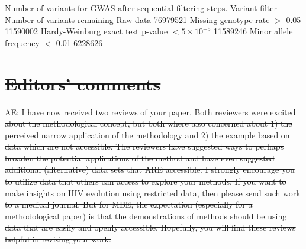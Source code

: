 \documentclass[12pt]{article} %
\providecommand{\DIFdel}[1]{{\protect\color{red}\sout{#1}}}                      %
\providecommand{\DIFdelbegin}{} %
\providecommand{\DIFdelend}{} %
\providecommand{\DIFdelFL}[1]{\DIFdel{#1}} %
\newcommand{\DIFscaledelfig}{0.5}
\newlength{\DIFdelgraphicswidth} %
\newlength{\DIFdelgraphicsheight} %
\newcommand{\DIFdelincludegraphics}[2][]{%
\sbox{\DIFdelgraphicsbox}{\DIFOincludegraphics[#1]{#2}}%
\settoboxwidth{\DIFdelgraphicswidth}{\DIFdelgraphicsbox} %
\settoboxtotalheight{\DIFdelgraphicsheight}{\DIFdelgraphicsbox} %
\scalebox{\DIFscaledelfig}{%
\parbox[b]{\DIFdelgraphicswidth}{\usebox{\DIFdelgraphicsbox}\\[-\baselineskip] \rule{\DIFdelgraphicswidth}{0em}}\llap{\resizebox{\DIFdelgraphicswidth}{\DIFdelgraphicsheight}{%
\setlength{\unitlength}{\DIFdelgraphicswidth}%
\begin{picture}(1,1)%
\thicklines\linethickness{2pt} %
{\color[rgb]{1,0,0}\put(0,0){\framebox(1,1){}}}%
{\color[rgb]{1,0,0}\put(0,0){\line( 1,1){1}}}%
{\color[rgb]{1,0,0}\put(0,1){\line(1,-1){1}}}%
\end{picture}%
}\hspace*{3pt}}} %
} %
\DeclareRobustCommand{\DIFdelbegin}{\DIFOdelbegin \let\includegraphics\DIFdelincludegraphics} %
\DeclareRobustCommand{\DIFdelend}{\DIFOaddend \let\includegraphics\DIFOincludegraphics} %
\begin{document}
{%
\DIFdelFL{Number of variants for GWAS after sequential filtering steps.}}
\DIFdelFL{Variant filter }%
\DIFdelFL{Number of variants remaining }%
\DIFdelFL{Raw data }%
\DIFdelFL{76979521 }%
\DIFdelFL{Missing genotype rate $>$ 0.05 }%
\DIFdelFL{11590002 }%
\DIFdelFL{Hardy-Weinburg exact test p-value $< 5 \times 10^{-5}$ }%
\DIFdelFL{11589246 }%
\DIFdelFL{Minor allele frequency $<$ 0.01 }%
\DIFdelFL{6228626 }%

\DIFdelend \stopsection
 \DIFdelbegin %
\section*{\DIFdel{Editors’ comments}}
\DIFdel{AE: I have now received two reviews of your paper. Both reviewers were excited about the methodological concept, but both where also concerned about 1) the perceived narrow application of the methodology and 2) the example based on data which are not accessible. The reviewers have suggested ways to perhaps broaden the potential applications of the method and have even suggested additional (alternative) data sets that ARE accessible.  I strongly encourage you to utilize data that others can access to explore your methods. If you want to make insights on HIV evolution using restricted data, then please send such work to a medical journal. But for MBE, the expectation (especially for a methodological paper) is that the demonstrations of methods should be using data that are easily and openly accessible.  Hopefully, you will find these reviews helpful in revising your work.
}%
\end{document}
